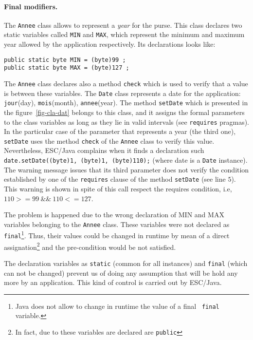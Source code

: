 \documentclass[a4paper]{llncs}
\begin{document}
\paragraph{Final modifiers.}

The \texttt{Annee} class allows to represent a \textit{year} for the
purse. This class declares two 
static variables called \texttt{MIN} and \texttt{MAX}, which represent
the minimum and maximum year allowed by the application
respectively. Its declarations looks like$:$
\begin{verbatim}
public static byte MIN = (byte)99 ;
public static byte MAX = (byte)127 ;
\end{verbatim}

The \texttt{Annee} class declares also a method \texttt{check} which is used to
verify that a value is between these variables. The \texttt{Date} class
represents a date for the application$:$ \texttt{jour}(day),
\texttt{mois}(month), \texttt{annee}(year). The method
\texttt{setDate} which is presented in the figure~\ref{fig-cla-dat}
belongs to this class, and it assigns the formal parameters to the
class variables as long as they lie in valid intervals (see
\texttt{requires} pragmas). In the particular case of the parameter
that represents a year (the third one), \texttt{setDate} uses the
method \texttt{check} of the \texttt{Annee} class to verify this
value. Nevertheless, ESC/Java complains when it
finds a declaration such
\mbox{\tt date.setDate((byte)1, (byte)1, (byte)110);} (where date is a
\texttt{Date} instance). The warning message issues that its third
parameter does not verify the condition established by one of the
\texttt{requires} clause of the method \texttt{setDate} (see line
$5$). This warning is shown in spite of this call respect the
requires condition, i.e, $110>=99\ \&\&\ 110<= 127$.

The problem is happened due to the wrong declaration of \textsc{MIN}
and \textsc{MAX} variables belonging to the \texttt{Annee}
class. These variables were not declared as \texttt{final}\footnote{{\sc
Java} does not allow to change in runtime the value of a final {\tt
final} variable.}. Thus, their values could be changed in runtime by
mean of a direct assignation\footnote{In fact, due to these variables
are declared are \texttt{public}} and the pre-condition would be not
satisfied. 


The declaration variables as \texttt{static} (common for all instances)
and \texttt{final} (which can not be changed) prevent us of doing
any assumption that will be hold any more by an
application. This kind of control is carried out by
ESC/Java. 
\end{document}

